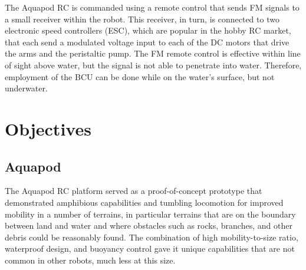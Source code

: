 		The Aquapod RC is commanded using a remote control that sends FM signals to a small receiver within the robot. This receiver, in turn, is connected to two electronic speed controllers (ESC), which are popular in the hobby RC market, that each send a modulated voltage input to each of the DC motors that drive the arms and the peristaltic pump. The FM remote control is effective within line of sight above water, but the signal is not able to penetrate into water. Therefore, employment of the BCU can be done while on the water's surface, but not underwater.   





\section{Objectives}


\subsection{Aquapod}

The Aquapod RC platform served as a proof-of-concept prototype that  demonstrated amphibious capabilities and tumbling locomotion for improved mobility in a number of terrains, in particular terrains that are on the boundary between land and water and where obstacles such as rocks, branches, and other debris could be reasonably found. The combination of high mobility-to-size ratio, waterproof design, and buoyancy control gave it unique capabilities that are not common in other robots, much less at this size. 

